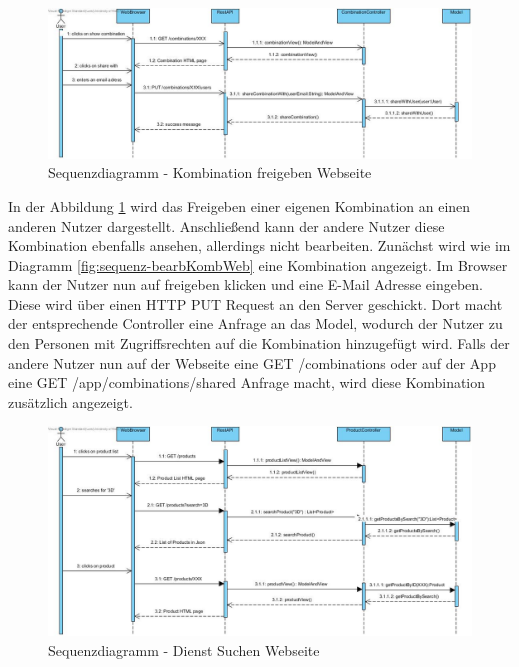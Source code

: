 \begin{figure}[h]
	\centering
	\includegraphics[width=\textwidth]{sequenzdiagramm/Kombination_freigeben}
	\caption{Sequenzdiagramm - Kombination freigeben Webseite}
	\label{fig:sequenz-freiKombWeb}
\end{figure}
\FloatBarrier
In der Abbildung \ref{fig:sequenz-freiKombWeb} wird das Freigeben einer eigenen Kombination an einen anderen Nutzer dargestellt.
Anschließend kann der andere Nutzer diese Kombination ebenfalls ansehen, allerdings nicht bearbeiten.
Zunächst wird wie im Diagramm \ref{fig:sequenz-bearbKombWeb} eine Kombination angezeigt.
Im Browser kann der Nutzer nun auf freigeben klicken und eine E-Mail Adresse eingeben.
Diese wird über einen HTTP PUT Request an den Server geschickt.
Dort macht der entsprechende Controller eine Anfrage an das Model, wodurch der Nutzer zu den Personen mit Zugriffsrechten auf die Kombination hinzugefügt wird.
Falls der andere Nutzer nun auf der Webseite eine GET /combinations oder auf der App eine GET /app/combinations/shared Anfrage macht, wird diese Kombination zusätzlich angezeigt.

\begin{figure}[h]
	\centering
	\includegraphics[width=\textwidth]{sequenzdiagramm/Dienstsuchen}
	\caption{Sequenzdiagramm - Dienst Suchen Webseite}
	\label{fig:sequenz-suchDienstWeb}
\end{figure}
\FloatBarrier

